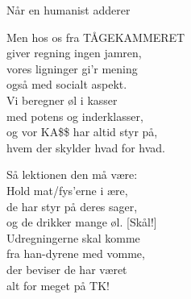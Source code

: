 \begin{song}{Når en humanist adderer}
  \begin{SBVerse}
    Men hos os fra TÅGEKAMMERET\\
    giver regning ingen jamren,\\
    vores ligninger gi’r mening\\
    også med socialt aspekt.\\
    Vi beregner øl i kasser\\
    med potens og inderklasser,\\
    og vor KA\$\$ har altid styr på,\\
    hvem der skylder hvad for hvad.
  \end{SBVerse}

  \begin{SBVerse}
    Så lektionen den må være:\\
    Hold mat/fys’erne i ære,\\
    de har styr på deres sager,\\
    og de drikker mange øl. [Skål!]\\
    Udregningerne skal komme\\
    fra han-dyrene med vomme,\\
    der beviser de har været\\
    alt for meget på TK!
  \end{SBVerse}
\end{song}